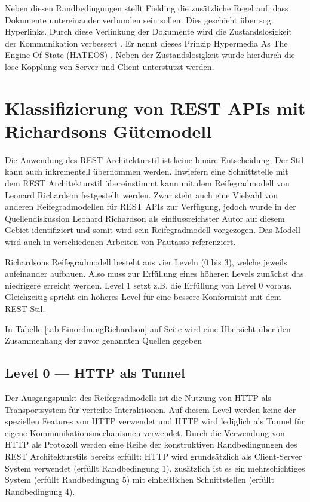 Neben diesen Randbedingungen stellt Fielding die zusätzliche Regel auf, dass Dokumente untereinander verbunden sein sollen. Dies geschieht über sog. Hyperlinks. Durch diese Verlinkung der Dokumente wird die Zustandslosigkeit der Kommunikation verbessert . Er nennt dieses Prinzip Hypermedia As The Engine Of State (HATEOS)  . Neben der Zustandslosigkeit würde hierdurch die lose Kopplung von Server und Client unterstützt werden.

\section{Klassifizierung von REST APIs mit Richardsons Gütemodell}

Die Anwendung des REST Architekturstil ist keine binäre Entscheidung; Der Stil kann auch inkrementell übernommen werden. Inwiefern eine Schnittstelle mit dem REST Architekturstil übereinstimmt kann mit dem Reifegradmodell von Leonard Richardson festgestellt werden. Zwar steht auch eine Vielzahl von anderen Reifegradmodellen für REST APIs zur Verfügung, jedoch wurde in der Quellendiskussion Leonard Richardson als einflussreichster Autor auf diesem Gebiet identifiziert und somit wird sein Reifegradmodell vorgezogen. Das Modell wird auch in verschiedenen Arbeiten  von Pautasso referenziert.

Richardsons Reifegradmodell besteht aus vier Leveln (0 bis 3), welche jeweils aufeinander aufbauen. Also muss zur Erfüllung eines höheren Levels zunächst das niedrigere erreicht werden. Level 1 setzt z.B. die Erfüllung von Level 0 voraus. Gleichzeitig spricht ein höheres Level für eine bessere Konformität mit dem REST Stil.

In Tabelle \ref{tab:EinordnungRichardson} auf Seite \pageref{tab:EinordnungRichardson} wird eine Übersicht über den Zusammenhang der zuvor genannten Quellen gegeben 

\subsection{Level 0 — HTTP als Tunnel}

Der Ausgangspunkt des Reifegradmodells ist die Nutzung von HTTP als Transportsystem für verteilte Interaktionen. Auf diesem Level werden keine der speziellen Features von HTTP verwendet und HTTP wird lediglich als Tunnel für eigene Kommunikationsmechanismen verwendet. Durch die Verwendung von HTTP als Protokoll werden eine Reihe der konstruktiven Randbedingungen des REST Architekturstils bereits erfüllt: HTTP wird grundsätzlich als Client-Server System verwendet (erfüllt Randbedingung 1), zusätzlich ist es ein mehrschichtiges System (erfüllt Randbedingung 5) mit einheitlichen Schnittstellen (erfüllt Randbedingung 4).

